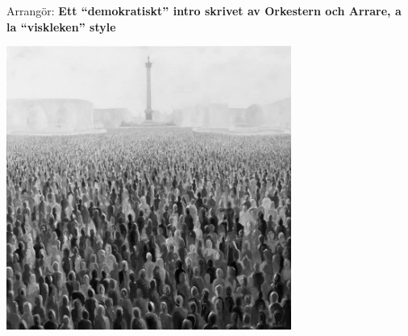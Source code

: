\vspace*{\fill}
\begin{center}{\large Arrangör: \textbf{Ett ``demokratiskt'' intro skrivet av Orkestern och Arrare, a la ``viskleken'' style}}\end{center}
\begin{center}\includegraphics[width = 0.7\textwidth]{Bilder/Aktintron/crowd.jpg}
\end{center}

\vspace*{\fill}
\newpage
\begingroup\fontsize{11}{12}\selectfont %
\endgroup
\newpage
\begingroup\fontsize{11}{12}\selectfont
{}
\endgroup
\newpage
\begingroup\fontsize{11}{12}\selectfont
{}
\endgroup
\newpage
\begingroup\fontsize{11}{12}\selectfont
{}
\endgroup
\newpage


